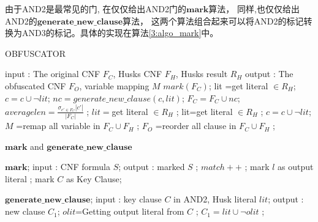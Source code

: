 由于AND2是最常见的门,
在仅仅给出AND2门的$\mathbf{mark}$算法，
同样,也仅仅给出AND2的$\mathbf{generate\_new\_clause}$算法，
这两个算法组合起来可以将AND2的标记转换为AND3的标记。具体的实现在算法\ref{3:algo_mark}中。

\begin{algorithm}[t]
\caption{OBFUSCATOR}
\label{3:algo_obs}
\begin{algorithmic}[1]
\STATE input : The original CNF $F_C$, Husks CNF $F_H$, Husks result $R_H$
\STATE output : The obfuscated CNF $F_O$, variable mapping $M$
\STATE $mark(F_C)$;\label{3:mark}
 \label{3:keyclause}
\STATE     lit =get literal $ \in R_H$;
\STATE     $c=c \cup \neg lit$;\label{3:rule1}
\STATE     $nc=generate\_new\_clause(c,lit)$;\label{3:gennewclause}
 \STATE    $F_C=F_C \cup nc$;\label{3:blendclause1}
\ENDIF
\ENDFOR
{}
\STATE $averagelen=\frac{\sigma _{c'\in F_C}|c'|}{|F_C|}$ ;
\STATE $lit=$get literal $\in R_H$ ;
\STATE lit=get literal $ \in R_H $ ;
\ENDWHILE
\STATE $c=c \cup \neg lit$;\label{3:rule1-2}
\ENDWHILE
\STATE $M$ =remap all variable in $F_C\cup F_H$ ;\label{3:MV}
\STATE $F_O$ =reorder all clause in $F_C\cup F_H$ ; \label{3:blendclause2}
\ENDFOR
\end{algorithmic}
\end{algorithm}

\begin{algorithm}[t]
\caption{$\mathbf{mark}$ and $\mathbf{generate\_new\_clause}$}
\label{3:algo_mark}
\begin{algorithmic}[1]
\STATE $\mathbf{mark}$;
\STATE input : CNF formula $S$;
\STATE output : marked $S$ ;
\STATE $match++$ ;
\ENDIF
\ENDFOR
\ENDFOR
\ENDFOR
\ENDFOR
{}
\STATE mark $l$ as output literal ;
\STATE mark $C$ as Key Clause;
\ENDIF

\STATE $\mathbf{generate\_new\_clause}$;
\STATE input : key clause $C$ in AND2, Husk literal $lit$;
\STATE output : new clause $C_1$;
\STATE $olit$=Getting output literal from $C$ ;
\STATE $C_1= lit \cup \neg olit$ ;\label{3:rule2}
\end{algorithmic}
\end{algorithm}



